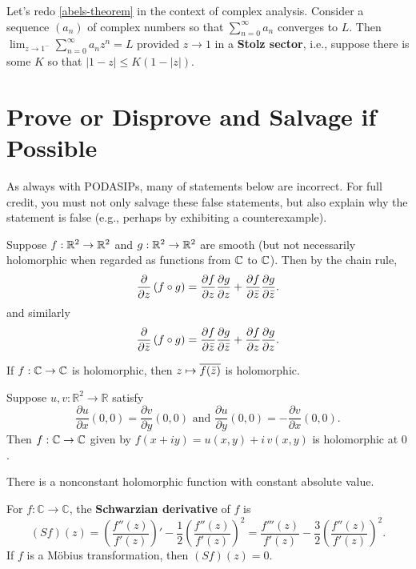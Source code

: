 \documentclass{homework}
\begin{document}
\begin{problem}
  Let's redo \ref{abels-theorem} in the context of complex analysis.
  Consider a sequence $(a_n)$ of complex numbers so that
  $\sum_{n=0}^\infty a_n$ converges to $L$.  Then
  $\lim_{z \to 1^{-}} \sum_{n=0}^\infty a_n z^n = L$ provided
  $z \to 1$ in a \textbf{Stolz sector}, i.e., suppose there is some
  $K$ so that $|1-z| \leq K(1-|z|)$.
\end{problem}

\section{Prove or Disprove and Salvage if Possible}

As always with PODASIPs, many of statements below are incorrect.  For
full credit, you must not only salvage these false statements, but
also explain why the statement is false (e.g., perhaps by exhibiting a
counterexample).

\begin{problem}
  Suppose $f : \mathbb{R}^2 \to \mathbb{R}^2$ and $g : \mathbb{R}^2 \to \mathbb{R}^2$ are smooth (but
  not necessarily holomorphic when regarded as functions from $\mathbb{C}$ to
  $\mathbb{C}$).  Then by the chain rule,
  \[
    \frac{\partial}{\partial z} \left( f \circ g \right) =
    \frac{\partial f}{\partial z} \frac{\partial g}{\partial z} + \frac{\partial f}{\partial \bar{z}} \frac{\partial g}{\partial \bar{z}}.
  \]
  and similarly
  \[
    \frac{\partial}{\partial \bar{z}} \left( f \circ g \right) =
    \frac{\partial f}{\partial \bar{z}} \frac{\partial g}{\partial \bar{z}} + \frac{\partial f}{\partial z} \frac{\partial g}{\partial z}.
  \]
\end{problem}

\begin{problem}\label{schwarz-reflection-principle}If $f : \mathbb{C} \to \mathbb{C}$ is holomorphic, then $z \mapsto \overline{f(\bar{z})}$ is holomorphic.
\end{problem}

\begin{problem}\label{cauchy-riemann-alone-not-sufficient}Suppose $u, v : \mathbb{R}^2 \to \mathbb{R}$ satisfy
  \[
    \frac{\partial u}{\partial x}(0,0)=\frac{\partial v}{\partial y}(0,0)
    \mbox{ and }
    \frac{\partial u}{\partial y}(0,0)=-\frac{\partial v}{\partial x}(0,0).
  \]
  Then $f : \mathbb{C} \to \mathbb{C}$ given by $f(x+iy) = u(x,y) + i \, v(x,y)$ is holomorphic at $0$.
\end{problem}

\begin{problem}\label{open-mapping-theorem-preview}There is a nonconstant holomorphic function with constant absolute value.
\end{problem}

\begin{problem}\label{schwarzian-derivative}For $f : \mathbb{C} \to \mathbb{C}$, the \textbf{Schwarzian derivative} of $f$ is
  \[ (Sf)(z)=\left({\frac{f''(z)}{f'(z)}}\right)'-{\frac12}\left(\frac{f''(z)}{f'(z)}\right)^2={\frac {f'''(z)}{f'(z)}}-{\frac32}\left(\frac{f''(z)}{f'(z)}\right)^2. \]
  If $f$ is a M\"obius transformation, then $(Sf)(z) = 0$.
\end{problem}
\end{document}
